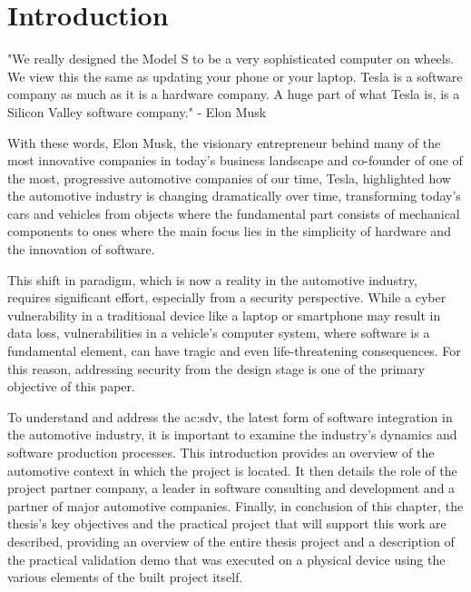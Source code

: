 \hypersetup{
    colorlinks=true,
    linkcolor=blue
}

\chapter{Introduction} \label{ch:introduction}
\begin{center}
  "We really designed the Model S to be a very sophisticated computer on wheels. We view this the same as updating your phone or your laptop. Tesla is a software company as much as it is a hardware company. A huge part of what Tesla is, is a Silicon Valley software company."
  - Elon Musk \cite{ElonMusk}
\end{center}
With these words, Elon Musk, the visionary entrepreneur behind many of the most innovative companies in today's business landscape and co-founder of one of the most, progressive automotive companies of our time, Tesla, highlighted how the automotive industry is changing dramatically over time, transforming today's cars and vehicles from objects where the fundamental part consists of mechanical components to ones where the main focus lies in the simplicity of hardware and the innovation of software.

This shift in paradigm, which is now a reality in the automotive industry, requires significant effort, especially from a security perspective. While a cyber vulnerability in a traditional device like a laptop or smartphone may result in data loss, vulnerabilities in a vehicle's computer system, where software is a fundamental element, can have tragic and even life-threatening consequences. For this reason, addressing security from the design stage is one of the primary objective of this paper.

To understand and address the \gls{ac:sdv}, the latest form of software integration in the automotive industry, it is important to examine the industry's dynamics and software production processes. This introduction provides an overview of the automotive context in which the project is located. It then details the role of the project partner company, a leader in software consulting and development and a partner of major automotive companies. Finally, in conclusion of this chapter, the thesis's key objectives and the practical project that will support this work are described, providing an overview of the entire thesis project and a description of the practical validation demo that was executed on a physical device using the various elements of the built project itself.

